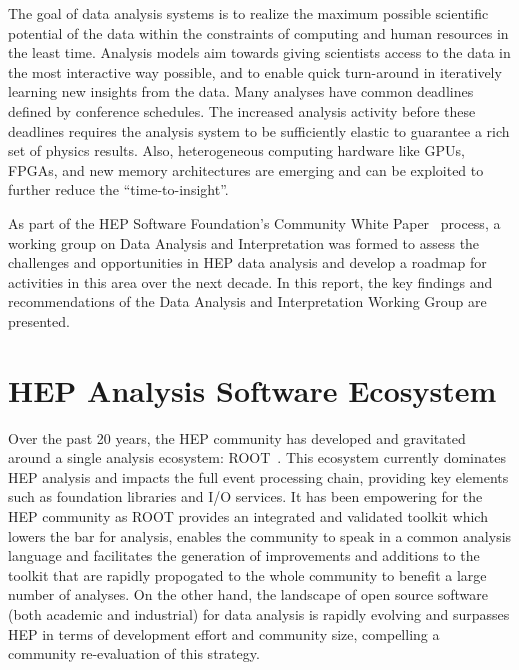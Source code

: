 \documentclass[12pt,a4paper]{article}
\begin{document}
The goal of data analysis systems is to realize the maximum possible scientific potential of the data within the constraints of computing and human resources in the least time.
Analysis models aim towards giving scientists access to the data in the most interactive way possible, and to enable quick turn-around in iteratively learning new insights from the data. Many analyses have common deadlines defined by conference schedules. The increased analysis activity before these deadlines requires the analysis system to be sufficiently elastic to guarantee a rich set of physics results. Also, heterogeneous computing hardware like GPUs, FPGAs, and new memory architectures are emerging and can be exploited to further reduce the ``time-to-insight''.

As part of the HEP Software Foundation’s Community White Paper~\cite{HSF-CWP-2017-01} process, a working group on Data Analysis and Interpretation was formed to assess the challenges and opportunities in HEP data analysis and develop a roadmap for activities in this area over the next decade. In this report, the key findings and recommendations of the Data Analysis and Interpretation Working Group are presented.

\section{HEP Analysis Software Ecosystem}

Over the past 20 years, the HEP community has developed and gravitated around a single analysis ecosystem: ROOT~\cite{Brun1996}. This ecosystem currently dominates HEP analysis and impacts the full event processing chain, providing key elements such as foundation libraries and I/O services. It has been empowering for the HEP community as ROOT provides an integrated and validated toolkit which lowers the bar for analysis, enables the community to speak in a common analysis language and facilitates the generation of improvements and additions to the toolkit that are rapidly propogated to the whole community to benefit a large number of analyses. On the other hand, the landscape of open source software (both academic and industrial) for data analysis is rapidly evolving and surpasses HEP in terms of development effort and community size, compelling a community re-evaluation of this strategy.
\end{document}
